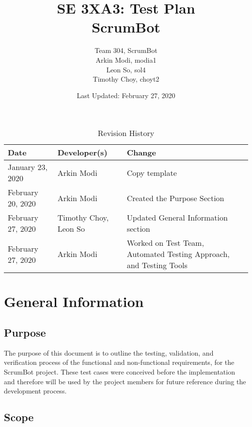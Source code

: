 \documentclass[12pt, titlepage]{article}
\title{SE 3XA3: Test Plan\\ScrumBot}
\author{
    Team 304, ScrumBot
        \\ Arkin Modi, modia1
        \\ Leon So, sol4
        \\ Timothy Choy, choyt2
}
\date{Last Updated: February 27, 2020}
\begin{document}
\newpage
\maketitle

\tableofcontents
\listoftables
\listoffigures

\newpage

\begin{table}[!h]
    \caption{Revision History} \label{TblRevisionHistory}
    \begin{tabularx}{\textwidth}{llX}
        \toprule
            \textbf{Date} & \textbf{Developer(s)} & \textbf{Change}\\
        \midrule
            January 23, 2020 & Arkin Modi & Copy template\\
            February 20, 2020 & Arkin Modi & Created the Purpose Section\\
            February 27, 2020 & Timothy Choy, Leon So & Updated General Information section\\
            February 27, 2020 & Arkin Modi & Worked on Test Team, Automated Testing Approach, and Testing Tools\\
        \bottomrule
    \end{tabularx}
\end{table}


\newpage


\section{General Information}

\subsection{Purpose}
The purpose of this document is to outline the testing, validation, and verification process of the functional and non-functional requirements, for the ScrumBot project. These test cases were conceived before the implementation and therefore will be used by the project members for future reference during the development process.

\subsection{Scope}
\end{document}
